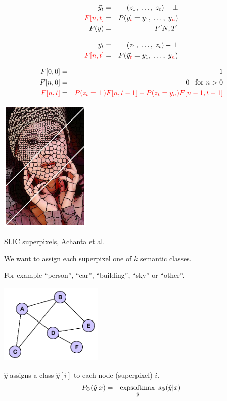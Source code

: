 {\vfill

\begin{eqnarray*}
  \vec{y}_t & = & (z_1,\;\ldots,\;z_t)-\bot \\
  {\color{red} F[n,t]} & = & P(\vec{y}_{\color{red} t} = y_1,\;\ldots,\;y_{\color{red} n}) \\
  P(y) & = & F[N,T]
\end{eqnarray*}


\begin{eqnarray*}
  \vec{y}_t & = & (z_1,\;\ldots,\;z_t)-\bot \\
  {\color{red} F[n,t]} & = & P(\vec{y}_{\color{red} t} = y_1,\;\ldots,\;y_{\color{red} n}) \\
\end{eqnarray*}

\begin{eqnarray*}
  F[0,0] & = & 1 \\
  F[n,0] & = & 0 \;\;\;\mbox{for $n > 0$} \\
  {\color{red} F[n,t]} & = & {\color{red} P(z_t = \bot) F[n,t-1] + P(z_t = y_n)F[n-1,t-1]}
\end{eqnarray*}

\centerline{\includegraphics[height = 2.5in]{../images/SLICcolor}}
\centerline{\huge SLIC superpixels, Achanta et al.}

\vfill
We want to assign each superpixel one of $k$ semantic classes.

\vfill
For example ``person'', ``car'', ``building'', ``sky'' or ``other''.

\bigskip
\centerline{\includegraphics[height= 1.5in]{../images/Graph}}
\medskip
$\hat{y} $ assigns a class $\hat{y}[i]$ to each node (superpixel) $i$.
\bigskip
\bigskip
{\color{red}
\begin{eqnarray*}
P_\Phi(\hat{y}|x) & = & \operatorname*{expsoftmax}_{\hat{y}}\;s_\Phi(\hat{y}|x)
\end{eqnarray*}
}

}
